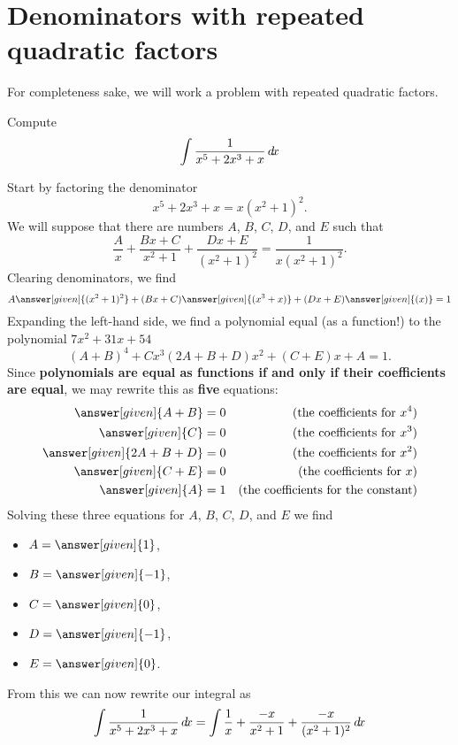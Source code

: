 \documentclass{ximera}
\begin{document}
\section{Denominators with repeated quadratic factors}

For completeness sake, we will work a problem with repeated quadratic factors.

\begin{example}
  Compute
  \[
  \int \frac{1}{x^5 + 2x^3  + x}\mathop{}\!d\! x
  \]
  \begin{explanation}
    Start by factoring the denominator
    \[
    x^5 + 2x^3  + x = x(x^2+1)^2.
    \]
    We will suppose that there are numbers $A$, $B$, $C$, $D$, and $E$
    such that
    \[
    \frac{A}{x} + \frac{Bx+C}{x^2+1} + \frac{Dx+E}{(x^2+1)^2} = \frac{1}{x(x^2+1)^2}.
    \]
    Clearing denominators, we find
    \[
    A\answer[given]{(x^2+1)^2} + (Bx+C)\answer[given]{(x^3+x)}+ (Dx+E)\answer[given]{(x)} = 1
    \]
    Expanding the left-hand side, we find a polynomial equal (as a
    function!) to the polynomial $7x^2+31x+54$
    \[
    (A+B)^4 +  Cx^3 (2A+B+D)x^2 + (C+E)x + A = 1.
    \]
    Since \textbf{polynomials are equal as functions if and only if
      their coefficients are equal}, we may rewrite this as
    \textbf{five} equations:
    \begin{align*}
      \answer[given]{A+B} &= 0 &\text{(the coefficients for $x^4$)}\\
      \answer[given]{C} &= 0 &\text{(the coefficients for $x^3$)}\\
      \answer[given]{2A+B+D} &= 0 &\text{(the coefficients for $x^2$)}\\
      \answer[given]{C+E} &= 0 &\text{(the coefficients for $x$)}\\
      \answer[given]{A} &= 1 &\text{(the coefficients for the constant)}
    \end{align*}
    Solving these three equations for $A$, $B$, $C$, $D$, and $E$ we find
    \begin{itemize}
    \item $A = \answer[given]{1}$,
    \item $B = \answer[given]{-1}$,
    \item $C = \answer[given]{0}$,
    \item $D = \answer[given]{-1}$,
    \item $E = \answer[given]{0}$.
    \end{itemize}
    From this we can now rewrite our integral as
    \[
    \int \frac{1}{x^5 + 2x^3  + x}\mathop{}\!d\! x =\int \frac{1}{x} + \frac{-x}{x^2+1} + \frac{-x}{(x^2+1)^2}\mathop{}\!d\! x
\]
\end{explanation}
\end{example}
\end{document}
